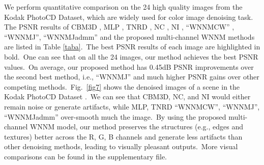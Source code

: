 \documentclass[10pt,twocolumn,letterpaper]{article}
\begin{document}
We perform quantitative comparison on the 24 high quality images from the Kodak PhotoCD Dataset, which are widely used for color image denoising task. The PSNR results of CBM3D \cite{bm3d}, MLP \cite{mlp}, TNRD \cite{chen2015learning}, NC \cite{noiseclinic,ncwebsite}, NI \cite{neatimage}, ``WNNMCW'' \cite{wnnmijcv}, ``WNNMJ'', ``WNNMJadmm'' and the proposed multi-channel WNNM methods are listed in Table \ref{taba}.\ The best PSNR results of each image are highlighted in bold.\ One can see that on all the 24 images, our method achieves the best PSNR values.\ On average, our proposed method has 0.45dB PSNR improvements over the second best method, i.e., ``WNNMJ'' and much higher PSNR gains over other competing methods.\ Fig.\ \ref{fig7} shows the denoised images of a scene in the Kodak PhotoCD Dataset .\ We can see that CBM3D, NC, and NI would either remain noise or generate artifacts, while MLP, TNRD ``WNNMCW'', ``WNNMJ'', ``WNNMJadmm'' over-smooth much the image.\ By using the proposed multi-channel WNNM model, our method preserves the structures (e.g., edges and textures) better across the R, G, B channels and generate less artifacts than other denoising methods, leading to visually pleasant outputs.\ More visual comparisons can be found in the supplementary file.
\end{document}
